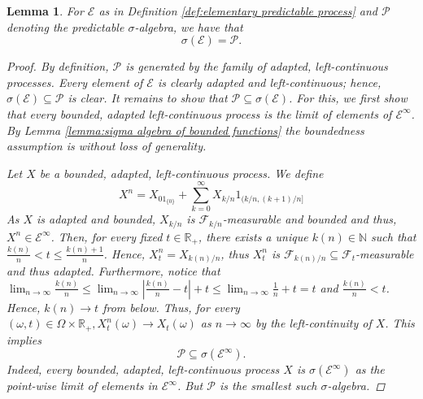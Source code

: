 \documentclass[11pt,a4paper,twoside,openany]{report}
\numberwithin{equation}{section}
\theoremstyle{plain} %
\newtheorem{lemma}[theorem]{Lemma}
\theoremstyle{definition} %
\theoremstyle{remark} %
\begin{document}
\begin{lemma}\label{lemma:elementary processes generated predictable sigma algebra}
    For \(\mathcal{E}\) as in Definition \ref{def:elementary predictable process} and \(\mathcal{P}\) denoting the predictable \(\sigma\)-algebra, we have that 
    \begin{equation*}
        \sigma(\mathcal{E})=\mathcal{P}.
    \end{equation*}
    \begin{proof}
        By definition, \(\mathcal{P}\) is generated by the family of adapted, left-continuous processes. Every element of \(\mathcal{E}\) is clearly adapted and left-continuous; hence, \(\sigma(\mathcal{E})\subseteq\mathcal{P}\) is clear. It remains to show that \(\mathcal{P}\subseteq\sigma(\mathcal{E})\). For this, we first show that every bounded, adapted left-continuous process is the limit of elements of \(\mathcal{E}^{\infty}\). By Lemma \ref{lemma:sigma algebra of bounded functions} the boundedness assumption is without loss of generality.
        
        
           Let \(X\) be a bounded, adapted, left-continuous process. We define
        \begin{equation}\label{eq:approximating adapted left-continuous process}
            X^n= X_01_{\{0\}}+\sum_{k=0}^\infty X_{k/n}1_{(k/n,(k+1)/n]}
        \end{equation}
        As \(X\) is adapted and bounded, \(X_{k/n}\) is \(\mathcal{F}_{k/n}\)-measurable and bounded and thus, \(X^n\in\mathcal{E}^{\infty}\). Then, for every fixed \(t\in\mathbb{R}_+\), there exists a unique \(k(n)\in\mathbb{N}\) such that \(\frac{k(n)}{n}<t\leq \frac{k(n)+1}{n}\). Hence, \(X_t^n=X_{k(n)/n}\), thus \(X_t^n\) is \(\mathcal{F}_{k(n)/n}\subseteq\mathcal{F}_t\)-measurable and thus adapted. Furthermore, notice that \(\lim_{n\to\infty}\frac{k(n)}{n}\leq\lim_{n\to\infty}|\frac{k(n)}{n}-t|+t\leq\lim_{n\to\infty}\frac{1}{n}+t=t\) and \(\frac{k(n)}{n}<t\). Hence, \(k(n)\to t\) from below. Thus, for every \((\omega,t)\in\Omega\times\mathbb{R}_+,X^n_t(\omega)\to X_t(\omega)\) as \(n\to\infty\) by the left-continuity of \(X\). This implies 
        \begin{equation*}
            \mathcal{P}\subseteq\sigma(\mathcal{E}^{\infty}).
        \end{equation*}
        Indeed, every bounded, adapted, left-continuous process \(X\) is \(\sigma(\mathcal{E}^{\infty})\) as the point-wise limit of elements in \(\mathcal{E}^{\infty}\). But \(\mathcal{P}\) is the smallest such \(\sigma\)-algebra.




\end{proof}
\end{lemma}
\end{document}
